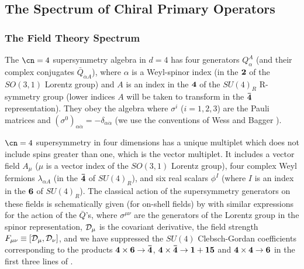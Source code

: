 \subsection{The Spectrum of Chiral Primary Operators}
\label{chiralops}

\subsubsection{The Field Theory Spectrum}
\label{fieldspect}

The $\cn=4$ supersymmetry algebra in $d=4$ has four generators
$Q_\alpha^A$ (and their complex conjugates ${\bar
Q}_{\dot{\alpha}A}$), where $\alpha$ is a Weyl-spinor index
(in the $\bf 2$ of the $SO(3,1)$ Lorentz group) and $A$ is an index in
the $\bf 4$ of the $SU(4)_R$ R-symmetry group (lower indices $A$ will be
taken to transform in the $\bf {\bar 4}$ representation). 
They obey the algebra
where $\sigma^i$ ($i=1,2,3$) are the Pauli matrices and
$(\sigma^0)_{\alpha \dot{\alpha}}=-\delta_{\alpha \dot{\alpha}}$
(we use the conventions of Wess and Bagger \cite{Bagger}).

$\cn=4$ supersymmetry in four dimensions has a unique multiplet which
does not include spins greater than one, which is the vector
multiplet. It includes a vector field $A_\mu$ ($\mu$ is a vector
index of the $SO(3,1)$ Lorentz group), four complex
Weyl fermions $\lambda_{\alpha A}$ (in the $\bf {\bar 4}$ of
$SU(4)_R$), and six real scalars
$\phi^{I}$ (where $I$ is an index in the $\bf 6$ of $SU(4)_R$). The
classical action of the supersymmetry generators on these fields is
schematically given (for on-shell fields) by
with similar expressions for the action of the $\bar Q$'s, where
$\sigma^{\mu \nu}$ are the generators of the Lorentz group in the
spinor representation, ${\cal D}_\mu$ is the covariant derivative,
the field strength
$F_{\mu \nu} \equiv [{\cal D}_\mu, {\cal D}_\nu]$, and we have suppressed
the $SU(4)$ Clebsch-Gordan coefficients corresponding to the products
$\bf{4\times 6 \to {\bar 4}}$, $\bf{4\times {\bar 4} \to 1+15}$ and
$\bf{4\times 4 \to 6}$ in the first three lines of .

